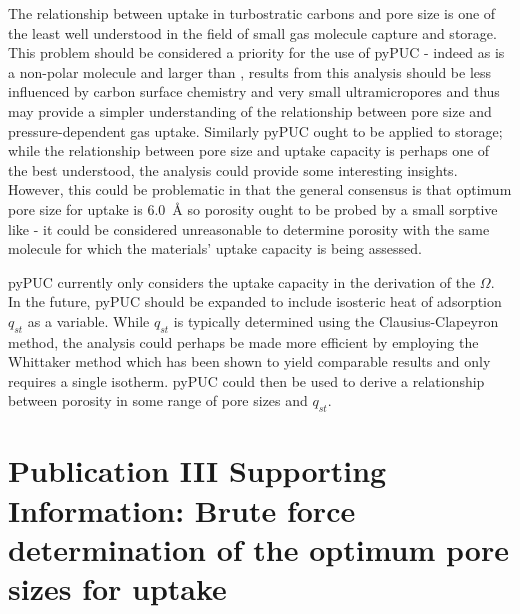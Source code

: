The relationship between  uptake in \glspl{turbostratic carbon} and pore size is one of the least well understood in the field of small gas molecule capture and storage.\citep{Matranga1992Molecular, Tan1990Adsorption, Simon2015materials, Biloe2002Optimal} This problem should be considered a priority for the use of pyPUC - indeed as  is a non-polar molecule and larger than ,\citep{Breck1974Zeolite, Poling2001Properties} results from this analysis should be less influenced by carbon surface chemistry and very small \glspl{ultramicropore} and thus may provide a simpler understanding of the relationship between pore size and pressure-dependent gas uptake. Similarly pyPUC ought to be applied to  storage; while the relationship between pore size and  uptake capacity is perhaps one of the best understood, the analysis could provide some interesting insights. However, this could be problematic in that the general consensus is that optimum pore size for  uptake is \qty{6.0}{\angstrom}\citep{DelaCasaLillo2002Hydrogen, Cabria2007optimum} so porosity ought to be probed by a small sorptive like  - it could be considered unreasonable to determine porosity with the same molecule for which the materials' uptake capacity is being assessed.

pyPUC currently only considers the uptake capacity in the derivation of the $\Omega$. In the future, pyPUC should be expanded to include isosteric heat of \gls{adsorption} $q_{st}$ as a variable. While $q_{st}$ is typically determined using the Clausius-Clapeyron method,\citep{clausius1850ueber, clapeyron1834memoire} the analysis could perhaps be made more efficient by employing the Whittaker method which has been shown to yield comparable results and only requires a single isotherm.\citep{whittaker2013predicting, li2018adsorption} pyPUC could then be used to derive a relationship between porosity in some range of pore sizes and $q_{st}$.

\newpage
\section[Publication III Supporting Information]{\texorpdfstring{Publication III Supporting Information: Brute force determination of the optimum pore sizes for  uptake}{Publication III Supporting Information: Brute force determination of the optimum pore sizes for CO2 uptake}}

\setcounter{opagenum}{\thepage}

\newpage

